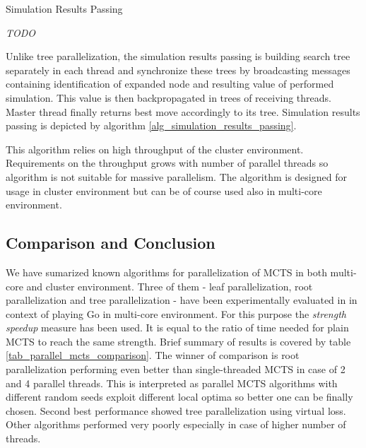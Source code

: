 \begin{algorithm}
\DontPrintSemicolon
\caption{Simulation Results Passing}
\label{alg_simulation_results_passing}
\emph{TODO}\;
\end{algorithm}

Unlike tree parallelization, the simulation results passing is building search tree separately in
each thread and synchronize these trees by broadcasting messages containing identification of
expanded node and resulting value of performed simulation. This value is then backpropagated in
trees of receiving threads. Master thread finally returns best move accordingly to its tree.
Simulation results passing is depicted by algorithm \ref{alg_simulation_results_passing}.

This algorithm relies on high throughput of the cluster environment. Requirements on the throughput
grows with number of parallel threads so algorithm is not suitable for massive parallelism. The
algorithm is designed for usage in cluster environment but can be of course used also in multi-core
environment.


\subsection{Comparison and Conclusion}

We have sumarized known algorithms for parallelization of MCTS in both multi-core and cluster
environment. Three of them - leaf parallelization, root parallelization and tree parallelization -
have been experimentally evaluated in \cite{Chaslot2008} in context of playing Go in multi-core
environment. For this purpose the \emph{strength speedup} measure has been used. It is equal to
 the ratio of time needed for plain
MCTS to reach the same strength. Brief summary of results is covered by table
\ref{tab_parallel_mcts_comparison}. The winner of comparison is root parallelization performing even
better than single-threaded MCTS in case of 2 and 4 parallel threads. This is interpreted as 
parallel MCTS algorithms with different random seeds exploit different local optima so better one
can be finally chosen. Second best performance showed tree parallelization using virtual loss. Other
algorithms performed very poorly especially in case of higher number of threads.

